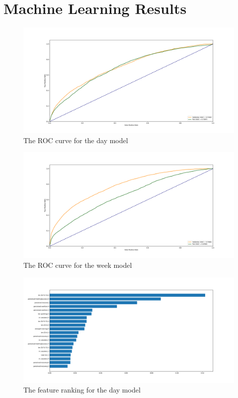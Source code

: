 \section{Machine Learning Results}
\begin{figure}
  \centering
  \includegraphics[width=\textwidth]{figures/day_ROC.pdf}
  \caption*{\label{fig:app_day_roc}The ROC curve for the day model}
\end{figure}
\begin{figure}
  \centering
  \includegraphics[width=\textwidth]{figures/week_ROC.pdf}
  \caption*{\label{fig:app_week_roc}The ROC curve for the week model}
\end{figure}
\begin{figure}
  \centering
  \includegraphics[width=\linewidth]{figures/day_featureranking.pdf}
  \captionsetup{justification=centering}
  \caption[Day Feature Ranking Chart]{\label{fig:app_day_features}The feature ranking for the day model}
\end{figure}
